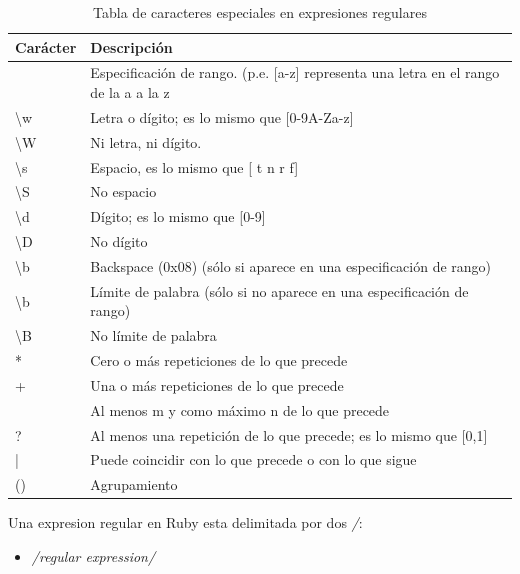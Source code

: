 \documentclass{article}
\begin{document}
\begin{table}[!hbt]
	\begin{center}
	\begin{tabular}{| l | l |}
		\hline
		\rowcolor[gray]{0.9}\textbf{Carácter} & \textbf{Descripción} \\
		\hline
		[] & Especificación de rango. (p.e. [a-z] representa una letra en el rango de la a a la z \\
		\hline
		\textbackslash w & Letra o dígito; es lo mismo que [0-9A-Za-z] \\
		\hline
		\textbackslash W & Ni letra, ni dígito. \\
		\hline
		\textbackslash s & Espacio, es lo mismo que [ t n r f] \\
		\hline
		\textbackslash S & No espacio \\
		\hline
		\textbackslash d & Dígito; es lo mismo que [0-9] \\
		\hline
		\textbackslash D & No dígito \\
		\hline
		\textbackslash b & Backspace (0x08) (sólo si aparece en una especificación de rango) \\
		\hline
		\textbackslash b & Límite de palabra (sólo si no aparece en una especificación de rango) \\
		\hline
		\textbackslash B & No límite de palabra \\
		\hline
		* & Cero o más repeticiones de lo que precede	\\
		\hline
		+ & Una o más repeticiones de lo que precede \\
		\hline
		[m,n] & Al menos m y como máximo n de lo que precede \\
		\hline
		? & Al menos una repetición de lo que precede; es lo mismo que [0,1]	\\
		\hline
		| & Puede coincidir con lo que precede o con lo que sigue \\
		\hline
		() & Agrupamiento \\
		\hline
	\end{tabular}
	\caption{Tabla de caracteres especiales en expresiones regulares}
	\end{center}

\end{table}

	Una expresion regular en Ruby esta delimitada por dos \textit{/}:
\begin{itemize}
	\itemsep=1pt \topsep=0pt \partopsep=0pt \parskip=0pt \parsep=0pt
	\item  		\textit{/regular expression/}
\end{itemize}
\end{document}
